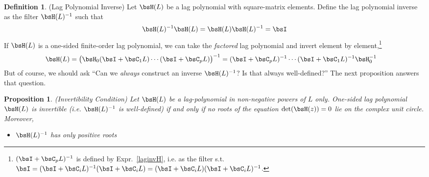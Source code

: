 \documentclass[12pt]{article}
\theoremstyle{plain}
\newtheorem{prop}[thm]{Proposition}
\theoremstyle{definition}
\newtheorem{defn}[thm]{Definition}
\theoremstyle{remark}
\newcommand{\bsPsi}{\boldsymbol{\Psi}}
\begin{document}
\begin{defn}(Lag Polynomial Inverse)
Let $\bsH(L)$ be a lag polynomial  with square-matrix elements. Define
the lag polynomial inverse as the filter $\bsH(L)^{-1}$ such that
\begin{align}
  \bsH(L)^{-1}\bsH(L) =
  \bsH(L)\bsH(L)^{-1} = \bsI
  \label{laginvH}
\end{align}
If $\bsH(L)$ is a one-sided finite-order lag polynomial, we can take the
\emph{factored} lag polynomial and invert element by element,\footnote{%
  $(\bsI+\bsC_pL)^{-1}$ is defined by Expr.~\ref{laginvH}, i.e.
  as the filter s.t.
  $\bsI=(\bsI+\bsC_iL)^{-1}(\bsI+\bsC_iL)=(\bsI+\bsC_iL)(\bsI+\bsC_iL)^{-1}$.
}
\begin{align*}
  \bsH(L)
  &= \big(\bsH_0(\bsI+\bsC_1 L)\cdots(\bsI+\bsC_pL)\big)^{-1}
  = (\bsI+\bsC_pL)^{-1}\cdots(\bsI+\bsC_1 L)^{-1}\bsH_0^{-1}
\end{align*}
But of course, we should ask ``Can we \emph{always} construct an inverse
$\bsH(L)^{-1}$? Is that always well-defined?'' The next proposition
answers that question.
\end{defn}

\begin{prop}\emph{(Invertibility Condition)}
Let $\bsH(L)$ be a lag-polynomial in \emph{non-negative} powers of $L$
only.
One-sided
lag polynomial $\bsH(L)$ is invertible (i.e. $\bsH(L)^{-1}$ is
well-defined) if and only if \emph{no roots} of the equation
$\det(\bsH(z))=0$ lie on the complex unit circle.
Moreover,
\begin{itemize}
  \item $\bsH(L)^{-1}$ has only positive roots
\end{itemize}
\end{prop}
\end{document}
